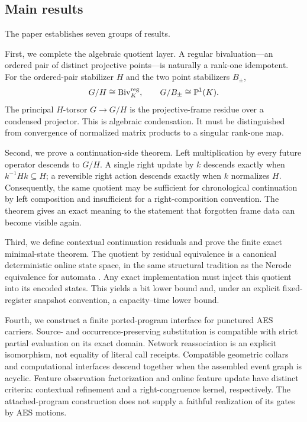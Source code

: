 \subsection{Main results}

The paper establishes seven groups of results.

First, we complete the algebraic quotient layer.  A regular bivaluation---an
ordered pair of distinct projective points---is naturally a rank-one
idempotent.  For the ordered-pair stabilizer $H$ and the two point stabilizers
$B_\pm$,
\[
  G/H\cong\operatorname{Biv}_K^{\mathrm{reg}},
  \qquad
  G/B_\pm\cong\mathbb{P}^1(K).
\]
The principal $H$-torsor $G\to G/H$ is the projective-frame residue over a
condensed projector.  This is algebraic condensation.  It must be distinguished
from convergence of normalized matrix products to a singular rank-one map.

Second, we prove a continuation-side theorem.  Left multiplication by every
future operator descends to $G/H$.  A single right update by $k$ descends
exactly when $k^{-1}Hk\subseteq H$; a reversible right action descends exactly
when $k$ normalizes $H$.  Consequently, the same quotient may be sufficient
for chronological continuation by left composition and insufficient for a
right-composition convention.  The theorem gives an exact meaning to the
statement that forgotten frame data can become visible again.

Third, we define contextual continuation residuals and prove the finite exact
minimal-state theorem.  The quotient by residual equivalence is a canonical
deterministic online state space, in the same structural tradition as the
Nerode equivalence for automata \cite{Nerode1958}.  Any exact implementation
must inject this quotient into its encoded states.  This yields a bit lower
bound and, under an explicit fixed-register snapshot convention, a
capacity--time lower bound.

Fourth, we construct a finite ported-program interface for punctured AES
carriers.  Source- and occurrence-preserving substitution is compatible with
strict partial evaluation on its exact domain.  Network reassociation is an
explicit isomorphism, not equality of literal call receipts.  Compatible
geometric collars and computational interfaces descend together when the
assembled event graph is acyclic.  Feature observation factorization and online
feature update have distinct criteria: contextual refinement and a
right-congruence kernel, respectively.  The attached-program construction does
not supply a faithful realization of its gates by AES motions.

